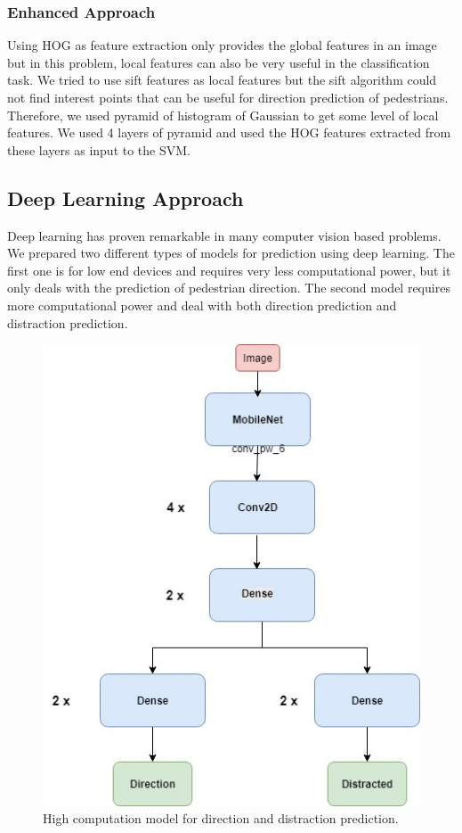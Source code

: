 \documentclass[extendedabs]{bmvc2k}
\begin{document}
\subsubsection{Enhanced Approach}
Using HOG as feature extraction only provides the global features in an image but in this problem, local features can also be very useful in the classification task. We tried to use sift features as local features but the sift algorithm could not find interest points that can be useful for direction prediction of pedestrians. Therefore, we used pyramid of histogram of Gaussian to get some level of local features. We used 4 layers of pyramid and used the HOG features extracted from these layers as input to the SVM.

\subsection{Deep Learning Approach}
Deep learning has proven remarkable in many computer vision based problems. We prepared two different types of models for prediction using deep learning. The first one is for low end devices and requires very less computational power, but it only deals with the prediction of pedestrian direction. The second model requires more computational power and deal with both direction prediction and distraction prediction.

\begin{figure}[t]
\includegraphics[width=\linewidth]{images/Full.jpg}
\caption{
High computation model for direction and distraction prediction.}
\label{fig:FULL}
\vspace{-2mm}
\end{figure}
\end{document}

